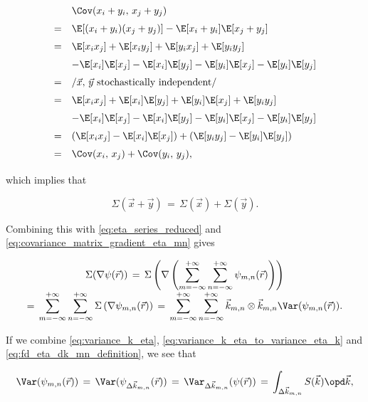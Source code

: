 \begin{equation}
\renewcommand*{\arraystretch}{1.5}
\begin{array}{cl}
  & \Cov(x_i+y_i,\,x_j+y_j) \\
= & \E[(x_i+y_i)(x_j+y_j)] - \E[x_i+y_i]\E[x_j+y_j] \\
= & \E[x_i x_j] + \E[x_i y_j] + \E[y_i x_j] + \E[y_i y_j] \\
  & - \E[x_i]\E[x_j] - \E[x_i]\E[y_j] - \E[y_i]\E[x_j] - \E[y_i]\E[y_j] \\
= & \left/ \vec{x},\, \vec{y}\ \text{stochastically independent}\right/ \\
= & \E[x_i x_j] + \E[x_i]\E[y_j] + \E[y_i]\E[x_j] + \E[y_i y_j] \\
  & - \E[x_i]\E[x_j] - \E[x_i]\E[y_j] - \E[y_i]\E[x_j] - \E[y_i]\E[y_j] \\
= & (\E[x_i x_j] - \E[x_i]\E[x_j]) + (\E[y_i y_j] - \E[y_i]\E[y_j]) \\
= & \Cov(x_i,\,x_j) + \Cov(y_i,\,y_j),
\end{array}
\end{equation}

which implies that

\begin{equation} \label{eq:covariance_matrix_sum}
\Sigma(\vec{x} + \vec{y}) \,=\, \Sigma(\vec{x}) + \Sigma(\vec{y}).
\end{equation}

Combining this with \eqref{eq:eta_series_reduced} and \eqref{eq:covariance_matrix_gradient_eta_mn} gives

\begin{equation} \label{eq:covariance_matrix_gradient_eta}
\renewcommand*{\arraystretch}{2}
\begin{array}{c}
\displaystyle \Sigma(\nabla\psi(\vec{r})) \,=\, \Sigma\left(\nabla\left(\sum_{m=-\infty}^{+\infty}\sum_{n=-\infty}^{+\infty} \psi_{m,n}(\vec{r})\right)\right) \\
\displaystyle =\, \sum_{m=-\infty}^{+\infty}\sum_{n=-\infty}^{+\infty}\Sigma\left(\nabla\psi_{m,n}(\vec{r})\right) \,=\, \sum_{m=-\infty}^{+\infty}\sum_{n=-\infty}^{+\infty}\vec{k}_{m,n}\otimes\vec{k}_{m,n} \Var(\psi_{m,n}(\vec{r})).
\end{array}
\end{equation}

If we combine \eqref{eq:variance_k_eta}, \eqref{eq:variance_k_eta_to_variance_eta_k} and \eqref{eq:fd_eta_dk_mn_definition}, we see that

\begin{equation}
\Var(\psi_{m,n}(\vec{r})) \,=\, \Var(\psi_{\Delta\vec{k}_{m,n}}(\vec{r})) \,=\, \Var_{\Delta\vec{k}_{m,n}}(\psi(\vec{r})) \,=\, \int_{\Delta\vec{k}_{m,n}}S(\vec{k})\opd\vec{k},
\end{equation}

